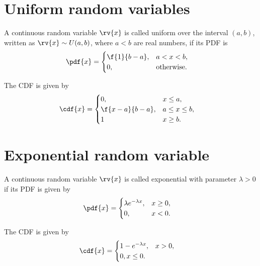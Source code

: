 \section{Uniform random variables}
\begin{definitionBox}
    A continuous random variable $\rv{x}$ is called uniform over the interval $(a,b)$, written as $\rv{x}\sim U(a,b)$, where $a<b$ are real numbers, if its PDF is
    \begin{align}
        \pdf{x} &= 
        \begin{cases}
            \f{1}{b-a}, & a < x < b,\\
            0, &\text{otherwise}.
        \end{cases}
    \end{align}
\end{definitionBox}

\begin{mytheorem}
     The CDF is given by
     \begin{align}
         \cdf{x} &=
         \begin{cases}
             0, & x \leq a,\\
             \f{x-a}{b-a}, & a\leq x\leq b,\\
             1& x \geq b.
         \end{cases}
     \end{align}
\end{mytheorem}

\section{Exponential random variable}
\begin{definitionBox}
    A continuous random variable $\rv{x}$ is called exponential with parameter $\lambda > 0$ if its PDF is given by
    \begin{align}
        \pdf{x} &= 
        \begin{cases}
            \lambda e^{-\lambda x}, &x\geq 0,\\
            0, &x<0.
        \end{cases}
    \end{align}
\end{definitionBox}
\begin{mytheorem}
   The CDF is given by
   \begin{align}
       \cdf{x} &= 
       \begin{cases}
           1 - e^{-\lambda x}, & x > 0,\\
           0, x \leq 0.
       \end{cases}
   \end{align}  
\end{mytheorem}


